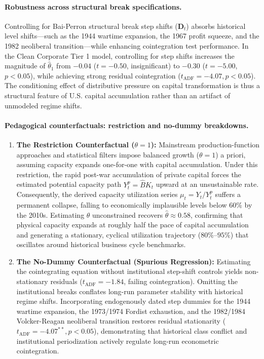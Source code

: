 \paragraph{Robustness across structural break specifications.}
Controlling for Bai-Perron structural break step shifts ($\mathbf{D}_t$) absorbs historical level shifts---such as the 1944 wartime expansion, the 1967 profit squeeze, and the 1982 neoliberal transition---while enhancing cointegration test performance. In the Clean Corporate Tier 1 model, controlling for step shifts increases the magnitude of $\hat{\theta}_1$ from $-0.04$ ($t = -0.50$, insignificant) to $-0.30$ ($t = -5.00$, $p < 0.05$), while achieving strong residual cointegration ($t_{\text{ADF}} = -4.07, p < 0.05$). The conditioning effect of distributive pressure on capital transformation is thus a structural feature of U.S. capital accumulation rather than an artifact of unmodeled regime shifts.

\paragraph{Pedagogical counterfactuals: restriction and no-dummy breakdowns.}
\begin{enumerate}
	\item \textbf{The Restriction Counterfactual ($\theta = 1$):} Mainstream production-function approaches and statistical filters impose balanced growth ($\theta = 1$) a priori, assuming capacity expands one-for-one with capital accumulation. Under this restriction, the rapid post-war accumulation of private capital forces the estimated potential capacity path $Y^p_t = \hat{B} K_t$ upward at an unsustainable rate. Consequently, the derived capacity utilization series $\mu_t = Y_t / Y^p_t$ suffers a permanent collapse, falling to economically implausible levels below $60\%$ by the 2010s. Estimating $\theta$ unconstrained recovers $\hat{\theta} \approx 0.58$, confirming that physical capacity expands at roughly half the pace of capital accumulation and generating a stationary, cyclical utilization trajectory ($80\%$--$95\%$) that oscillates around historical business cycle benchmarks.
	\item \textbf{The No-Dummy Counterfactual (Spurious Regression):} Estimating the cointegrating equation without institutional step-shift controls yields non-stationary residuals ($t_{\text{ADF}} = -1.84$, failing cointegration). Omitting the institutional breaks conflates long-run parameter stability with historical regime shifts. Incorporating endogenously dated step dummies for the 1944 wartime expansion, the 1973/1974 Fordist exhaustion, and the 1982/1984 Volcker-Reagan neoliberal transition restores residual stationarity ($t_{\text{ADF}} = -4.07^{**}, p < 0.05$), demonstrating that historical class conflict and institutional periodization actively regulate long-run econometric cointegration.
\end{enumerate}

